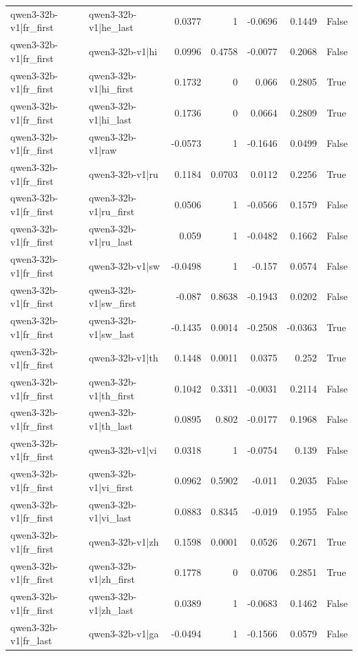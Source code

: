 \begin{table}
\begin{tabular}{l l r r r r l}
qwen3-32b-v1|fr_first & qwen3-32b-v1|he_last & 0.0377 & 1 & -0.0696 & 0.1449 & False \\
qwen3-32b-v1|fr_first & qwen3-32b-v1|hi & 0.0996 & 0.4758 & -0.0077 & 0.2068 & False \\
qwen3-32b-v1|fr_first & qwen3-32b-v1|hi_first & 0.1732 & 0 & 0.066 & 0.2805 & True \\
qwen3-32b-v1|fr_first & qwen3-32b-v1|hi_last & 0.1736 & 0 & 0.0664 & 0.2809 & True \\
qwen3-32b-v1|fr_first & qwen3-32b-v1|raw & -0.0573 & 1 & -0.1646 & 0.0499 & False \\
qwen3-32b-v1|fr_first & qwen3-32b-v1|ru & 0.1184 & 0.0703 & 0.0112 & 0.2256 & True \\
qwen3-32b-v1|fr_first & qwen3-32b-v1|ru_first & 0.0506 & 1 & -0.0566 & 0.1579 & False \\
qwen3-32b-v1|fr_first & qwen3-32b-v1|ru_last & 0.059 & 1 & -0.0482 & 0.1662 & False \\
qwen3-32b-v1|fr_first & qwen3-32b-v1|sw & -0.0498 & 1 & -0.157 & 0.0574 & False \\
qwen3-32b-v1|fr_first & qwen3-32b-v1|sw_first & -0.087 & 0.8638 & -0.1943 & 0.0202 & False \\
qwen3-32b-v1|fr_first & qwen3-32b-v1|sw_last & -0.1435 & 0.0014 & -0.2508 & -0.0363 & True \\
qwen3-32b-v1|fr_first & qwen3-32b-v1|th & 0.1448 & 0.0011 & 0.0375 & 0.252 & True \\
qwen3-32b-v1|fr_first & qwen3-32b-v1|th_first & 0.1042 & 0.3311 & -0.0031 & 0.2114 & False \\
qwen3-32b-v1|fr_first & qwen3-32b-v1|th_last & 0.0895 & 0.802 & -0.0177 & 0.1968 & False \\
qwen3-32b-v1|fr_first & qwen3-32b-v1|vi & 0.0318 & 1 & -0.0754 & 0.139 & False \\
qwen3-32b-v1|fr_first & qwen3-32b-v1|vi_first & 0.0962 & 0.5902 & -0.011 & 0.2035 & False \\
qwen3-32b-v1|fr_first & qwen3-32b-v1|vi_last & 0.0883 & 0.8345 & -0.019 & 0.1955 & False \\
qwen3-32b-v1|fr_first & qwen3-32b-v1|zh & 0.1598 & 0.0001 & 0.0526 & 0.2671 & True \\
qwen3-32b-v1|fr_first & qwen3-32b-v1|zh_first & 0.1778 & 0 & 0.0706 & 0.2851 & True \\
qwen3-32b-v1|fr_first & qwen3-32b-v1|zh_last & 0.0389 & 1 & -0.0683 & 0.1462 & False \\
qwen3-32b-v1|fr_last & qwen3-32b-v1|ga & -0.0494 & 1 & -0.1566 & 0.0579 & False \\

\end{tabular}
\end{table}
